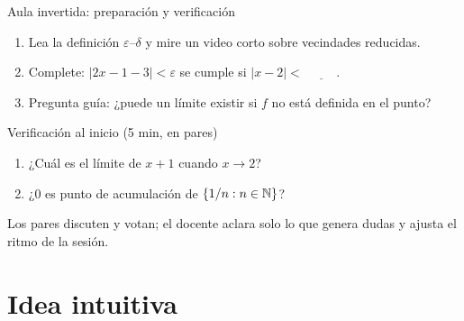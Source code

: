 \documentclass[10pt,aspectratio=169]{beamer}
\begin{document}
\begin{frame}{Aula invertida: preparación y verificación}
  \small
  \begin{previa}
    \begin{enumerate}
      \item Lea la definición $\varepsilon$--$\delta$ y mire un video corto sobre vecindades reducidas.
      \item Complete: $|2x-1-3|<\varepsilon$ se cumple si $|x-2|<\ \underline{\hspace{1cm}}$.
      \item Pregunta guía: ¿puede un límite existir si $f$ no está definida en el punto?
    \end{enumerate}
  \end{previa}
  \begin{block}{Verificación al inicio (5 min, en pares)}
    \begin{enumerate}
      \item ¿Cuál es el límite de $x+1$ cuando $x\to2$?
      \item ¿$0$ es punto de acumulación de $\{1/n:n\in\mathbb{N}\}$?
    \end{enumerate}
    Los pares discuten y votan; el docente aclara solo lo que genera dudas y ajusta el ritmo de la sesión.
  \end{block}
\end{frame}

\section{Idea intuitiva}
\end{document}

